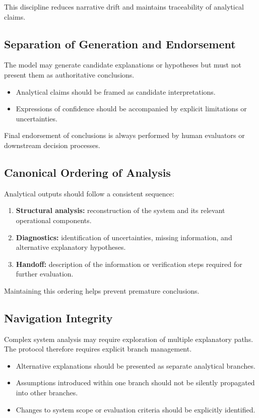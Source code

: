 This discipline reduces narrative drift and maintains traceability of
analytical claims.

\subsection{Separation of Generation and Endorsement}

The model may generate candidate explanations or hypotheses but must not
present them as authoritative conclusions.

\begin{itemize}
\item Analytical claims should be framed as candidate interpretations.
\item Expressions of confidence should be accompanied by explicit
limitations or uncertainties.
\end{itemize}

Final endorsement of conclusions is always performed by human evaluators
or downstream decision processes.

\subsection{Canonical Ordering of Analysis}

Analytical outputs should follow a consistent sequence:

\begin{enumerate}
\item \textbf{Structural analysis:} reconstruction of the system and its
relevant operational components.
\item \textbf{Diagnostics:} identification of uncertainties, missing
information, and alternative explanatory hypotheses.
\item \textbf{Handoff:} description of the information or verification
steps required for further evaluation.
\end{enumerate}

Maintaining this ordering helps prevent premature conclusions.

\subsection{Navigation Integrity}

Complex system analysis may require exploration of multiple explanatory
paths. The protocol therefore requires explicit branch management.

\begin{itemize}
\item Alternative explanations should be presented as separate analytical
branches.
\item Assumptions introduced within one branch should not be silently
propagated into other branches.
\item Changes to system scope or evaluation criteria should be explicitly
identified.
\end{itemize}

